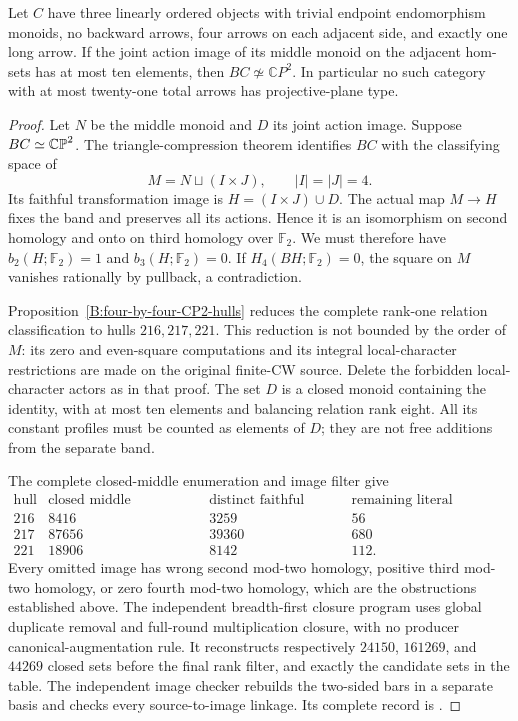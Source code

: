 \begin{theorem}
\label{C:linear-four-by-four-one-long-21}
Let $C$ have three linearly ordered objects with trivial endpoint
endomorphism monoids, no backward arrows, four arrows on each
adjacent side, and exactly one long arrow.  If the joint action
image of its middle monoid on the adjacent hom-sets has at most
ten elements, then $BC\not\simeq\mathbb CP^2$.
In particular no such category with at most twenty-one total
arrows has projective-plane type.
\end{theorem}
\begin{proof}
Let $N$ be the middle monoid and $D$ its joint action image.
Suppose $BC\simeq\mathbb {CP}^2$.  The triangle-compression theorem
identifies $BC$ with the classifying space of
\[
 M=N\sqcup(I\times J),\qquad |I|=|J|=4.
\]
Its faithful transformation image is $H=(I\times J)\cup D$.
The actual map $M\to H$ fixes the band and preserves all its
actions.  Hence it is an isomorphism on second homology and
onto on third homology over $\mathbb F_2$.  We must therefore
have $b_2(H;\mathbb F_2)=1$ and $b_3(H;\mathbb F_2)=0$.
If $H_4(BH;\mathbb F_2)=0$, the square on $M$ vanishes
rationally by pullback, a contradiction.

Proposition~\ref{B:four-by-four-CP2-hulls} reduces the complete
rank-one relation classification to hulls $216,217,221$.
This reduction is not bounded by the order of $M$: its zero
and even-square computations and its integral local-character
restrictions are made on the original finite-CW source.
Delete the forbidden local-character actors as in that proof.
The set $D$ is a closed monoid containing the identity, with
at most ten elements and balancing relation rank eight.
All its constant profiles must be counted as elements of $D$;
they are not free additions from the separate band.

The complete closed-middle enumeration and image filter give
\[
\begin{array}{c|r|r|r}
 \text{hull}&\text{closed middle submonoids}&
 \text{distinct faithful images}&\text{remaining literal categories}\\\hline
 216&8416&3259&56\\
 217&87656&39360&680\\
 221&18906&8142&112.
\end{array}
\]
Every omitted image has wrong second mod-two homology, positive
third mod-two homology, or zero fourth mod-two homology, which
are the obstructions established above.  The independent
breadth-first closure program uses global duplicate removal
and full-round multiplication closure, with no producer
canonical-augmentation rule.  It reconstructs respectively
$24150$, $161269$, and $44269$ closed sets before the final
rank filter, and exactly the candidate sets in the table.
The independent image checker rebuilds the two-sided bars in
a separate basis and checks every source-to-image linkage.
Its complete record is
.


\end{proof}
